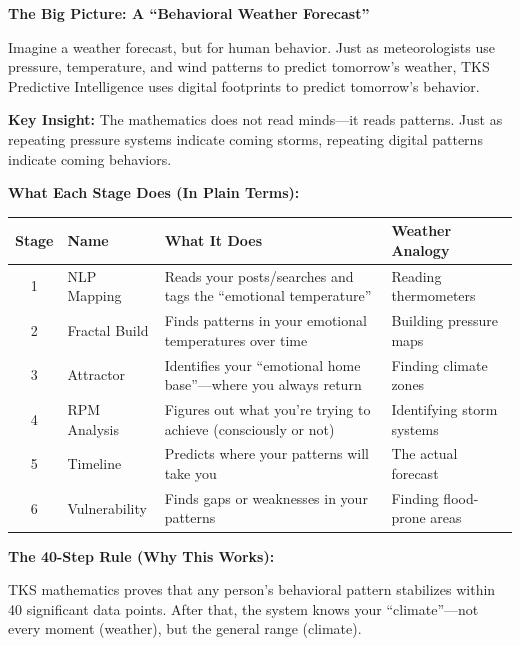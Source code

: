 \documentclass[11pt,twoside]{book}
\renewcommand{\arraystretch}{1.2}
\begin{document}
\begin{tcolorbox}[colback=green!5!white,colframe=green!65!black,title=\textbf{Plain English: Understanding TKS Predictive Intelligence},breakable]

\textbf{The Big Picture: A ``Behavioral Weather Forecast''}

Imagine a weather forecast, but for human behavior. Just as meteorologists use pressure, temperature, and wind patterns to predict tomorrow's weather, TKS Predictive Intelligence uses digital footprints to predict tomorrow's behavior.

\textbf{Key Insight:} The mathematics does not read minds---it reads patterns. Just as repeating pressure systems indicate coming storms, repeating digital patterns indicate coming behaviors.

\bigskip

\textbf{What Each Stage Does (In Plain Terms):}

\begin{center}
\footnotesize
\renewcommand{\arraystretch}{1.4}
\begin{tabularx}{\textwidth}{c|l|X|X}
\toprule
\textbf{Stage} & \textbf{Name} & \textbf{What It Does} & \textbf{Weather Analogy} \\
\midrule
1 & NLP Mapping & Reads your posts/searches and tags the ``emotional temperature'' & Reading thermometers \\
2 & Fractal Build & Finds patterns in your emotional temperatures over time & Building pressure maps \\
3 & Attractor & Identifies your ``emotional home base''---where you always return & Finding climate zones \\
4 & RPM Analysis & Figures out what you're trying to achieve (consciously or not) & Identifying storm systems \\
5 & Timeline & Predicts where your patterns will take you & The actual forecast \\
6 & Vulnerability & Finds gaps or weaknesses in your patterns & Finding flood-prone areas \\
\bottomrule
\end{tabularx}
\end{center}

\bigskip

\textbf{The 40-Step Rule (Why This Works):}

TKS mathematics proves that any person's behavioral pattern stabilizes within 40 significant data points. After that, the system knows your ``climate''---not every moment (weather), but the general range (climate).


\end{tcolorbox}
\end{document}
